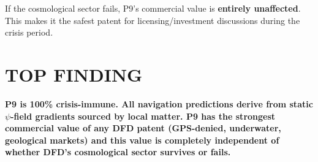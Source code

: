 \documentclass[11pt]{article}
\begin{document}
If the cosmological sector fails, P9's commercial value is \textbf{entirely
unaffected}. This makes it the safest patent for licensing/investment
discussions during the crisis period.

\section*{TOP FINDING}

\begin{tcolorbox}[colback=blue!5!white, colframe=blue!70!black]
\textbf{P9 is 100\% crisis-immune. All navigation predictions derive from
static $\psi$-field gradients sourced by local matter. P9 has the strongest
commercial value of any DFD patent (GPS-denied, underwater, geological
markets) and this value is completely independent of whether DFD's
cosmological sector survives or fails.}
\end{tcolorbox}
\end{document}
